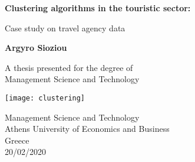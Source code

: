 \begin{titlepage}
    \begin{center}
        \vspace*{1cm}
 
        \Huge
        \textbf{Clustering algorithms in the touristic sector:}
 
        \vspace{0.5cm}
        \LARGE
        Case study on travel agency data
 
        \vspace{1.5cm}
 
        \textbf{Argyro Sioziou}

	\vspace{2.5cm}
 
        A thesis presented for the degree of\\
        Management Science and Technology
 
        \vspace{0.8cm}

	\texttt{[image: clustering]}

	\vfill

        \Large
        Management Science and Technology\\
        Athens University of Economics and Business\\
        Greece\\
        20/02/2020

	\vspace{2.5cm}
 
    \end{center}
\end{titlepage}